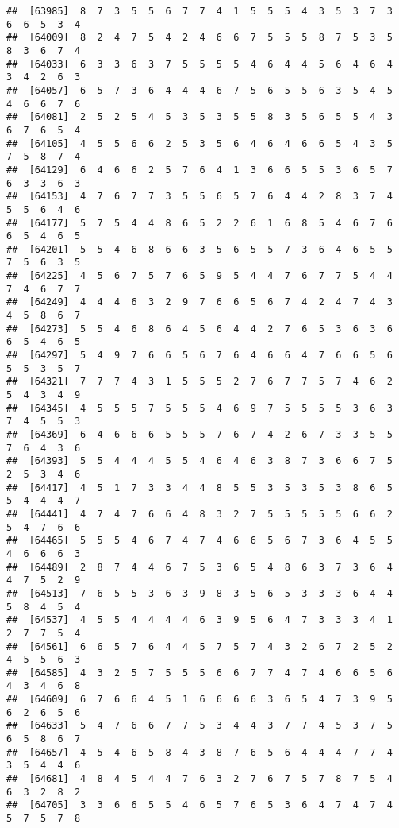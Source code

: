 \documentclass[
]{book}
\begin{document}
\begin{verbatim}
##  [63985]  8  7  3  5  5  6  7  7  4  1  5  5  5  4  3  5  3  7  3  6  6  5  3  4
##  [64009]  8  2  4  7  5  4  2  4  6  6  7  5  5  5  8  7  5  3  5  8  3  6  7  4
##  [64033]  6  3  3  6  3  7  5  5  5  5  4  6  4  4  5  6  4  6  4  3  4  2  6  3
##  [64057]  6  5  7  3  6  4  4  4  6  7  5  6  5  5  6  3  5  4  5  4  6  6  7  6
##  [64081]  2  5  2  5  4  5  3  5  3  5  5  8  3  5  6  5  5  4  3  6  7  6  5  4
##  [64105]  4  5  5  6  6  2  5  3  5  6  4  6  4  6  6  5  4  3  5  7  5  8  7  4
##  [64129]  6  4  6  6  2  5  7  6  4  1  3  6  6  5  5  3  6  5  7  6  3  3  6  3
##  [64153]  4  7  6  7  7  3  5  5  6  5  7  6  4  4  2  8  3  7  4  5  5  6  4  6
##  [64177]  5  7  5  4  4  8  6  5  2  2  6  1  6  8  5  4  6  7  6  6  5  4  6  5
##  [64201]  5  5  4  6  8  6  6  3  5  6  5  5  7  3  6  4  6  5  5  7  5  6  3  5
##  [64225]  4  5  6  7  5  7  6  5  9  5  4  4  7  6  7  7  5  4  4  7  4  6  7  7
##  [64249]  4  4  4  6  3  2  9  7  6  6  5  6  7  4  2  4  7  4  3  4  5  8  6  7
##  [64273]  5  5  4  6  8  6  4  5  6  4  4  2  7  6  5  3  6  3  6  6  5  4  6  5
##  [64297]  5  4  9  7  6  6  5  6  7  6  4  6  6  4  7  6  6  5  6  5  5  3  5  7
##  [64321]  7  7  7  4  3  1  5  5  5  2  7  6  7  7  5  7  4  6  2  5  4  3  4  9
##  [64345]  4  5  5  5  7  5  5  5  4  6  9  7  5  5  5  5  3  6  3  7  4  5  5  3
##  [64369]  6  4  6  6  6  5  5  5  7  6  7  4  2  6  7  3  3  5  5  7  6  4  3  6
##  [64393]  5  5  4  4  4  5  5  4  6  4  6  3  8  7  3  6  6  7  5  2  5  3  4  6
##  [64417]  4  5  1  7  3  3  4  4  8  5  5  3  5  3  5  3  8  6  5  5  4  4  4  7
##  [64441]  4  7  4  7  6  6  4  8  3  2  7  5  5  5  5  5  6  6  2  5  4  7  6  6
##  [64465]  5  5  5  4  6  7  4  7  4  6  6  5  6  7  3  6  4  5  5  4  6  6  6  3
##  [64489]  2  8  7  4  4  6  7  5  3  6  5  4  8  6  3  7  3  6  4  4  7  5  2  9
##  [64513]  7  6  5  5  3  6  3  9  8  3  5  6  5  3  3  3  6  4  4  5  8  4  5  4
##  [64537]  4  5  5  4  4  4  4  6  3  9  5  6  4  7  3  3  3  4  1  2  7  7  5  4
##  [64561]  6  6  5  7  6  4  4  5  7  5  7  4  3  2  6  7  2  5  2  4  5  5  6  3
##  [64585]  4  3  2  5  7  5  5  5  6  6  7  7  4  7  4  6  6  5  6  4  3  4  6  8
##  [64609]  6  7  6  6  4  5  1  6  6  6  6  3  6  5  4  7  3  9  5  6  2  6  5  6
##  [64633]  5  4  7  6  6  7  7  5  3  4  4  3  7  7  4  5  3  7  5  6  5  8  6  7
##  [64657]  4  5  4  6  5  8  4  3  8  7  6  5  6  4  4  4  7  7  4  3  5  4  4  6
##  [64681]  4  8  4  5  4  4  7  6  3  2  7  6  7  5  7  8  7  5  4  6  3  2  8  2
##  [64705]  3  3  6  6  5  5  4  6  5  7  6  5  3  6  4  7  4  7  4  5  7  5  7  8

\end{verbatim}
\end{document}
